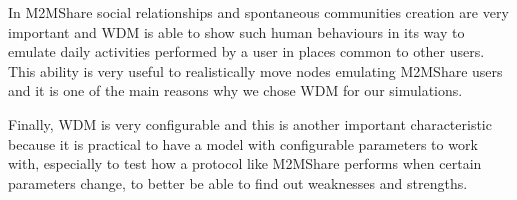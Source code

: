 In M2MShare social relationships and spontaneous communities creation are very important and WDM is able to show such human behaviours in its way to emulate daily activities performed by a user in places common to other users. This ability is very useful to realistically move nodes emulating M2MShare users and it is one of the main reasons why we chose WDM for our simulations.

Finally, WDM is very configurable and this is another important characteristic because it is practical to have a model with configurable parameters to work with, especially to test how a protocol like M2MShare performs when certain parameters change, to better be able to find out weaknesses and strengths.
 






